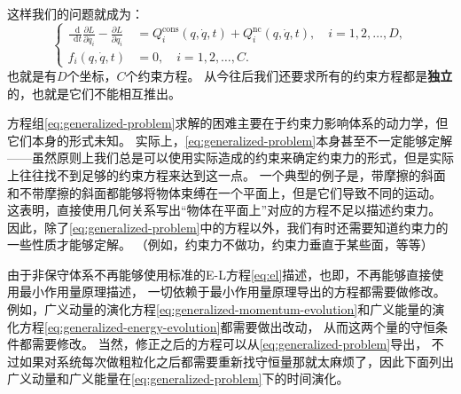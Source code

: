 \documentclass[UTF8, a4paper]{ctexart}
\newcommand*{\diff}{\mathop{}\!\mathrm{d}}
\begin{document}
这样我们的问题就成为：
\begin{equation}
    \left\{
        \begin{aligned}
            \frac{\diff}{\diff t} \frac{\partial L}{\partial \dot{q_i}} - \frac{\partial L}{\partial q_i} &= Q_i^{\text{cons}}(q, \dot{q}, t) + Q_i^{\text{nc}}(q, \dot{q}, t), 
            \quad i = 1, 2, \ldots, D, \\
            f_i(q, \dot{q}, t) &= 0, \quad i = 1, 2, \ldots, C.
        \end{aligned}
    \right.
    \label{eq:generalized-problem}
\end{equation}
也就是有$D$个坐标，$C$个约束方程。
从今往后我们还要求所有的约束方程都是\textbf{独立}的，也就是它们不能相互推出。

方程组\eqref{eq:generalized-problem}求解的困难主要在于约束力影响体系的动力学，但它们本身的形式未知。
实际上，\eqref{eq:generalized-problem}本身甚至不一定能够定解
——虽然原则上我们总是可以使用实际造成的约束来确定约束力的形式，但是实际上往往找不到足够的约束方程来达到这一点。
一个典型的例子是，带摩擦的斜面和不带摩擦的斜面都能够将物体束缚在一个平面上，但是它们导致不同的运动。
这表明，直接使用几何关系写出“物体在平面上”对应的方程不足以描述约束力。
因此，除了\eqref{eq:generalized-problem}中的方程以外，我们有时还需要知道约束力的一些性质才能够定解。
（例如，约束力不做功，约束力垂直于某些面，等等）

由于非保守体系不再能够使用标准的E-L方程\eqref{eq:el}描述，也即，不再能够直接使用最小作用量原理描述，
一切依赖于最小作用量原理导出的方程都需要做修改。
例如，广义动量的演化方程\eqref{eq:generalized-momentum-evolution}和广义能量的演化方程\eqref{eq:generalized-energy-evolution}都需要做出改动，
从而这两个量的守恒条件都需要修改。
当然，修正之后的方程可以从\eqref{eq:generalized-problem}导出，
不过如果对系统每次做粗粒化之后都需要重新找守恒量那就太麻烦了，因此下面列出广义动量和广义能量在\eqref{eq:generalized-problem}下的时间演化。
\end{document}
